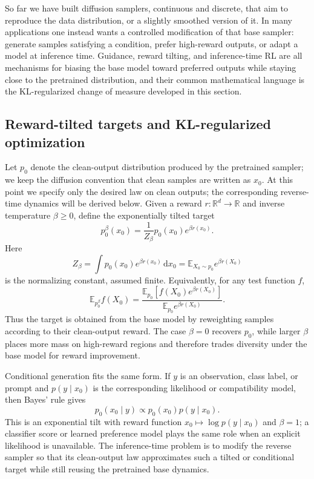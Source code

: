 \documentclass[10pt,a4paper]{amsart}
\numberwithin{equation}{section}
\newcommand{\R}{\mathbb{R}}
\newcommand{\E}{\mathbb{E}}
\newcommand{\dd}{\,\mathrm{d}}
\begin{document}
So far we have built diffusion samplers, continuous and discrete, that aim to
reproduce the data distribution, or a slightly smoothed version of it.  In many
applications one instead wants a controlled modification of that base sampler:
generate samples satisfying a condition, prefer high-reward outputs, or adapt a
model at inference time.  Guidance, reward tilting, and inference-time RL are all
mechanisms for biasing the base model toward preferred outputs while staying
close to the pretrained distribution, and their common mathematical language is
the KL-regularized change of measure developed in this section.

\subsection{Reward-tilted targets and KL-regularized optimization}

Let $p_0$ denote the clean-output distribution produced by the pretrained
sampler; we keep the diffusion convention that clean samples are written as
$x_0$.  At this point we specify only the desired law on clean outputs; the
corresponding reverse-time dynamics will be derived below.  Given a reward
$r:\R^d\to\R$ and inverse temperature $\beta\geq0$, define the exponentially
tilted target
\begin{equation}\label{eq:reward-tilt}
    p_0^\beta(x_0)
    =
    \frac{1}{Z_\beta}p_0(x_0)e^{\beta r(x_0)}.
\end{equation}
Here
\[
    Z_\beta=\int p_0(x_0)e^{\beta r(x_0)}\dd x_0
    =
    \E_{X_0\sim p_0}e^{\beta r(X_0)}
\]
is the normalizing constant, assumed finite.  Equivalently, for any test
function $f$,
\[
    \E_{p_0^\beta}f(X_0)
    =
    \frac{\E_{p_0}\!\left[f(X_0)e^{\beta r(X_0)}\right]}
    {\E_{p_0} e^{\beta r(X_0)}}.
\]
Thus the target is obtained from the base model by reweighting samples
according to their clean-output reward.  The case $\beta=0$ recovers $p_0$, while
larger $\beta$ places more mass on high-reward regions and therefore trades
diversity under the base model for reward improvement.

Conditional generation fits the same form.  If $y$ is an observation, class
label, or prompt and $p(y\mid x_0)$ is the corresponding likelihood or
compatibility model, then Bayes' rule gives
\[
    p_0(x_0\mid y)\propto p_0(x_0)p(y\mid x_0).
\]
This is an exponential tilt with reward function
$x_0\mapsto\log p(y\mid x_0)$ and $\beta=1$; a classifier score or learned
preference model plays the same role when an explicit likelihood is unavailable.
The inference-time problem is to modify the reverse sampler so that its
clean-output law approximates such a tilted or conditional target while still
reusing the pretrained base dynamics.
\end{document}
